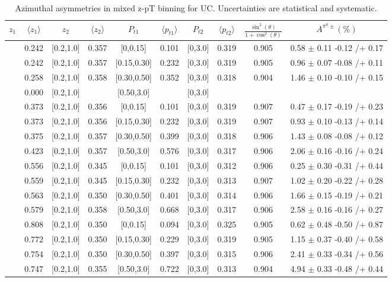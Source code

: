 \begin{table}[H]\scriptsize
\centering
\begin{tabular}{|c| c| c| c| c| c| c| c| c| c|}
\hline
$z_1$& $\langle  z_{1}  \rangle$ & $z_2$ & $\langle  z_{2}\rangle$& $P_{t1}$ & $\langle  p_{t1} \rangle$& $P_{t2}$ &  $\langle p_{t2}\rangle$ &$\frac{\sin^2(\theta)}{1+\cos^2(\theta)}$& $A^{\pi^0\pm}(\%)$   \\ \hline
[0.2,0.3]	&	0.242	&	[0.2,1.0]	&	0.357	&	[0,0.15]	&	0.101	&	[0,3.0]	&	0.319	&	0.905	&	0.58	$\pm$ 	0.11	-0.12	/+	0.17	\\ \hline
[0.2,0.3]	&	0.242	&	[0.2,1.0]	&	0.357	&	[0.15,0.30]	&	0.232	&	[0,3.0]	&	0.319	&	0.905	&	0.96	$\pm$ 	0.07	-0.08	/+	0.11	\\ \hline
[0.2,0.3]	&	0.258	&	[0.2,1.0]	&	0.358	&	[0.30,0.50]	&	0.352	&	[0,3.0]	&	0.318	&	0.904	&	1.46	$\pm$ 	0.10	-0.10	/+	0.15	\\ \hline
[0.2,0.3]	&	0.000	&	[0.2,1.0]	&		&	[0.50,3.0]	&		&	[0,3.0]	&		&		&			\\ \hline
[0.3,0.5]	&	0.373	&	[0.2,1.0]	&	0.356	&	[0,0.15]	&	0.101	&	[0,3.0]	&	0.319	&	0.907	&	0.47	$\pm$ 	0.17	-0.19	/+	0.23	\\ \hline
[0.3,0.5]	&	0.373	&	[0.2,1.0]	&	0.356	&	[0.15,0.30]	&	0.232	&	[0,3.0]	&	0.319	&	0.907	&	0.93	$\pm$ 	0.10	-0.13	/+	0.14	\\ \hline
[0.3,0.5]	&	0.375	&	[0.2,1.0]	&	0.357	&	[0.30,0.50]	&	0.399	&	[0,3.0]	&	0.318	&	0.906	&	1.43	$\pm$ 	0.08	-0.08	/+	0.12	\\ \hline
[0.3,0.5]	&	0.423	&	[0.2,1.0]	&	0.357	&	[0.50,3.0]	&	0.576	&	[0,3.0]	&	0.317	&	0.906	&	2.06	$\pm$ 	0.16	-0.16	/+	0.24	\\ \hline
[0.5,0.7]	&	0.556	&	[0.2,1.0]	&	0.345	&	[0,0.15]	&	0.101	&	[0,3.0]	&	0.312	&	0.906	&	0.25	$\pm$ 	0.30	-0.31	/+	0.44	\\ \hline
[0.5,0.7]	&	0.559	&	[0.2,1.0]	&	0.345	&	[0.15,0.30]	&	0.232	&	[0,3.0]	&	0.313	&	0.907	&	1.02	$\pm$ 	0.20	-0.22	/+	0.28	\\ \hline
[0.5,0.7]	&	0.563	&	[0.2,1.0]	&	0.350	&	[0.30,0.50]	&	0.401	&	[0,3.0]	&	0.314	&	0.906	&	1.66	$\pm$ 	0.15	-0.19	/+	0.21	\\ \hline
[0.5,0.7]	&	0.579	&	[0.2,1.0]	&	0.358	&	[0.50,3.0]	&	0.668	&	[0,3.0]	&	0.317	&	0.906	&	2.58	$\pm$ 	0.16	-0.16	/+	0.27	\\ \hline
[0.7,1.0]	&	0.808	&	[0.2,1.0]	&	0.350	&	[0,0.15]	&	0.094	&	[0,3.0]	&	0.325	&	0.905	&	0.62	$\pm$ 	0.48	-0.50	/+	0.87	\\ \hline
[0.7,1.0]	&	0.772	&	[0.2,1.0]	&	0.350	&	[0.15,0.30]	&	0.229	&	[0,3.0]	&	0.319	&	0.905	&	1.15	$\pm$ 	0.37	-0.40	/+	0.58	\\ \hline
[0.7,1.0]	&	0.754	&	[0.2,1.0]	&	0.350	&	[0.30,0.50]	&	0.397	&	[0,3.0]	&	0.315	&	0.906	&	2.41	$\pm$ 	0.33	-0.34	/+	0.56	\\ \hline
[0.7,1.0]	&	0.747	&	[0.2,1.0]	&	0.355	&	[0.50,3.0]	&	0.722	&	[0,3.0]	&	0.313	&	0.904	&	4.94	$\pm$ 	0.33	-0.48	/+	0.44	\\ \hline
\end{tabular}
\caption{Azimuthal asymmetries in mixed z-pT binning for UC. Uncertainties are statistical and systematic.}
\label{tab:finalucptbins}
\end{table}

